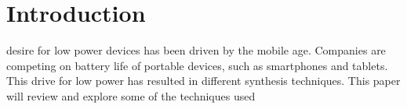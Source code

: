 

\section{Introduction}
 desire for low power devices has been driven by the mobile age.
Companies are competing on battery life of portable devices, such as smartphones and tablets.
This drive for low power has resulted in different synthesis techniques.
This paper will review and explore some of the techniques used 



